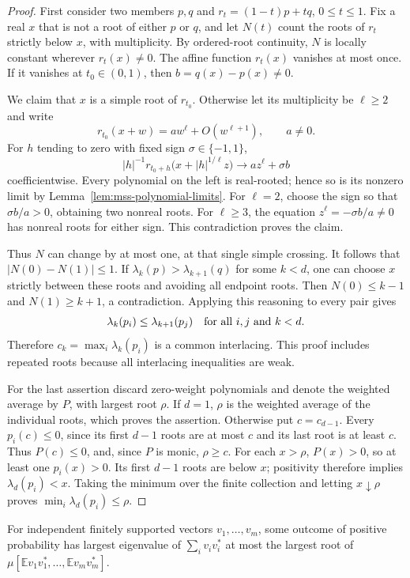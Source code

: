 \begin{proof}
First consider two members $p,q$ and
$r_t=(1-t)p+tq$, $0\leq t\leq1$.
Fix a real $x$ that is not a root of either $p$ or $q$, and let $N(t)$
count the roots of $r_t$ strictly below $x$, with multiplicity.
By ordered-root continuity, $N$ is locally constant wherever
$r_t(x)\ne0$.  The affine function $r_t(x)$ vanishes at most once.
If it vanishes at $t_0\in(0,1)$, then
$b=q(x)-p(x)\ne0$.

We claim that $x$ is a simple root of $r_{t_0}$.  Otherwise let its
multiplicity be $\ell\geq2$ and write
\[
 r_{t_0}(x+w)=aw^\ell+O(w^{\ell+1}),\qquad a\ne0.
\]
For $h$ tending to zero with fixed sign $\sigma\in\{-1,1\}$,
\[
 |h|^{-1}r_{t_0+h}\bigl(x+|h|^{1/\ell}z\bigr)
 \longrightarrow az^\ell+\sigma b
\]
coefficientwise.  Every polynomial on the left is real-rooted; hence
so is its nonzero limit by Lemma~\ref{lem:mss-polynomial-limits}.
For $\ell=2$, choose the sign so that $\sigma b/a>0$, obtaining
two nonreal roots.  For $\ell\geq3$, the equation
$z^\ell=-\sigma b/a\ne0$ has nonreal roots for either sign.
This contradiction proves the claim.

Thus $N$ can change by at most one, at that single simple crossing.
It follows that $|N(0)-N(1)|\leq1$.
If $\lambda_k(p)>\lambda_{k+1}(q)$ for some $k<d$, one can choose
$x$ strictly between these roots and avoiding all endpoint roots.
Then $N(0)\leq k-1$ and $N(1)\geq k+1$, a contradiction.
Applying this reasoning to every pair gives
\[
 \lambda_k(p_i)\leq\lambda_{k+1}(p_j)
 \quad\hbox{for all }i,j\hbox{ and }k<d.
\]
Therefore $c_k=\max_i\lambda_k(p_i)$ is a common interlacing.
This proof includes repeated roots because all interlacing
inequalities are weak.

For the last assertion discard zero-weight polynomials and denote
the weighted average by $P$, with largest root $\rho$.
If $d=1$, $\rho$ is the weighted average of the individual roots,
which proves the assertion.  Otherwise put $c=c_{d-1}$.
Every $p_i(c)\leq0$, since its first $d-1$ roots are at most $c$
and its last root is at least $c$.  Thus $P(c)\leq0$, and, since
$P$ is monic, $\rho\geq c$.
For each $x>\rho$, $P(x)>0$, so at least one $p_i(x)>0$.
Its first $d-1$ roots are below $x$; positivity therefore implies
$\lambda_d(p_i)<x$.  Taking the minimum over the finite collection
and letting $x\downarrow\rho$ proves
$\min_i\lambda_d(p_i)\leq\rho$.
\end{proof}

\begin{lemma}
\label{lem:mss-selection}
For independent finitely supported vectors $v_1,\ldots,v_m$, some
outcome of positive probability has largest eigenvalue of
$\sum_i v_iv_i^*$ at most the largest root of
$\mu[\mathbb E v_1v_1^*,\ldots,\mathbb E v_mv_m^*]$.
\end{lemma}

